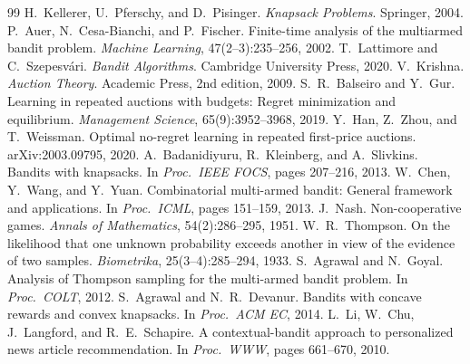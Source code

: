 \documentclass{article}
\theoremstyle{definition}
\begin{document}
\footnotesize
\begin{thebibliography}{99}
\setlength{\itemsep}{0pt}
 H.~Kellerer, U.~Pferschy, and D.~Pisinger. \emph{Knapsack Problems}. Springer, 2004.
 P.~Auer, N.~Cesa-Bianchi, and P.~Fischer. Finite-time analysis of the multiarmed bandit problem. \emph{Machine Learning}, 47(2--3):235--256, 2002.
 T.~Lattimore and C.~Szepesv{\'a}ri. \emph{Bandit Algorithms}. Cambridge University Press, 2020.
 V.~Krishna. \emph{Auction Theory}. Academic Press, 2nd edition, 2009.
 S.~R.~Balseiro and Y.~Gur. Learning in repeated auctions with budgets: Regret minimization and equilibrium. \emph{Management Science}, 65(9):3952--3968, 2019.
 Y.~Han, Z.~Zhou, and T.~Weissman. Optimal no-regret learning in repeated first-price auctions. arXiv:2003.09795, 2020.
 A.~Badanidiyuru, R.~Kleinberg, and A.~Slivkins. Bandits with knapsacks. In \emph{Proc.\ IEEE FOCS}, pages 207--216, 2013.
 W.~Chen, Y.~Wang, and Y.~Yuan. Combinatorial multi-armed bandit: General framework and applications. In \emph{Proc.\ ICML}, pages 151--159, 2013.
 J.~Nash. Non-cooperative games. \emph{Annals of Mathematics}, 54(2):286--295, 1951.
 W.~R.~Thompson. On the likelihood that one unknown probability exceeds another in view of the evidence of two samples. \emph{Biometrika}, 25(3--4):285--294, 1933.
 S.~Agrawal and N.~Goyal. Analysis of {T}hompson sampling for the multi-armed bandit problem. In \emph{Proc.\ COLT}, 2012.
 S.~Agrawal and N.~R.~Devanur. Bandits with concave rewards and convex knapsacks. In \emph{Proc.\ ACM EC}, 2014.
 L.~Li, W.~Chu, J.~Langford, and R.~E.~Schapire. A contextual-bandit approach to personalized news article recommendation. In \emph{Proc.\ WWW}, pages 661--670, 2010.
\end{thebibliography}
\end{document}
